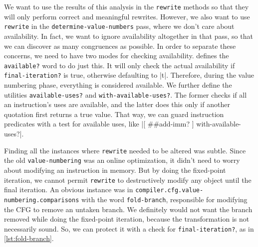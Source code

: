 We want to use the results of this analysis in the \Verb|rewrite| methods so
that they will only perform correct and meaningful rewrites.  However, we also
want to use \Verb|rewrite| in the \Verb|determine-value-numbers| pass, where we
don't care about availability.  In fact, we want to ignore availability
altogether in that pass, so that we can discover as many congruences as
possible.  In order to separate these concerns, we need to have two modes for
checking availability.   defines the \Verb|available?| word to
do just this.  It will only check the actual availability if
\Verb|final-iteration?| is true, otherwise defaulting to \factor|t|.
Therefore, during the value numbering phase, everything is considered
available.  We further define the utilities \Verb|available-uses?| and
\Verb|with-available-uses?|.  The former checks if all an instruction's uses
are available, and the latter does this only if another quotation first returns
a true value.  That way, we can guard instruction predicates with a test for
available uses, like
%
\factor|[ ##add-imm? ] with-available-uses?|.

Finding all the instances where \Verb|rewrite| needed to be altered was subtle.
Since the old \Verb|value-numbering| was an online optimization, it didn't need
to worry about modifying an instruction in memory.  But by doing the
fixed-point iteration, we cannot permit \Verb|rewrite| to destructively modify
any object until the final iteration.  An obvious instance was in
\Verb|compiler.cfg.value-numbering.comparisons| with the word
\Verb|fold-branch|, responsible for modifying the \gls{CFG} to remove an
untaken branch.  We definitely would not want the branch removed while doing
the fixed-point iteration, because the transformation is not necessarily sound.
So, we can protect it with a check for \Verb|final-iteration?|, as in
\vref{lst:fold-branch}.


